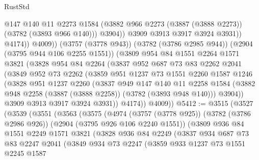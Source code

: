 \begin{lexlean}{RustStd}
\begin{coremodule}
                      @147
                      @140
                      @11
                      @2273
                      @1584
                      (@3882 @966 @2273 (@3887 (@3888 @2273)) (@3782 (@3893 @966 @140)))
                      @3904))
                  @3909
                  @3913
                  @3917
                  @3924
                  @3931))
              @4174))
          @4009))
      (@3757 (@3778 @943))
      (@3782 (@3786 @2985 @944))
      (@2904 (@3795 @944 @106 @2255 @1551))
      (@3809
        @954
        @84
        @1551
        @2264
        @1571
        @3821
        (@3828
          @954
          @84
          @2264
          (@3837
            @952
            @687
            @73
            @83
            @2262
            @2041
            (@3849
              @952
              @73
              @2262
              (@3859
                @951
                @1237
                @73
                @1551
                @2260
                @1587
                @1246
                (@3828
                  @951
                  @1237
                  @2260
                  (@3837
                    @949
                    @147
                    @140
                    @11
                    @2258
                    @1584
                    (@3882 @948 @2258 (@3887 (@3888 @2258)) (@3782 (@3893 @948 @140)))
                    @3904))
                @3909
                @3913
                @3917
                @3924
                @3931))
            @4174))
        @4009))
@5412 := @3515
    (@3527
      (@3539
        (@3551
          (@3563
            (@3575
              (@4974
                (@3757 (@3778 @925))
                (@3782 (@3786 @2986 @926))
                (@2904 (@3795 @926 @106 @2240 @1551))
                (@3809
                  @936
                  @84
                  @1551
                  @2249
                  @1571
                  @3821
                  (@3828
                    @936
                    @84
                    @2249
                    (@3837
                      @934
                      @687
                      @73
                      @83
                      @2247
                      @2041
                      (@3849
                        @934
                        @73
                        @2247
                        (@3859
                          @933
                          @1237
                          @73
                          @1551
                          @2245
                          @1587

\end{coremodule}
\end{lexlean}
